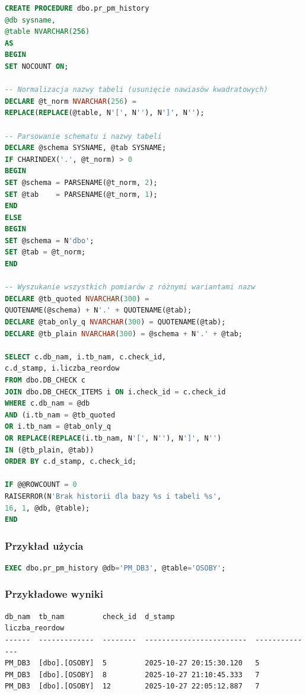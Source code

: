 \documentclass[a4paper,11pt]{article}
\begin{document}
	\begin{lstlisting}[language=SQL]
CREATE PROCEDURE dbo.pr_pm_history
@db sysname,
@table NVARCHAR(256)
AS
BEGIN
SET NOCOUNT ON;
		
-- Normalizacja nazwy tabeli (usunięcie nawiasów kwadratowych)
DECLARE @t_norm NVARCHAR(256) = 
REPLACE(REPLACE(@table, N'[', N''), N']', N'');
		
-- Parsowanie schematu i nazwy tabeli
DECLARE @schema SYSNAME, @tab SYSNAME;
IF CHARINDEX('.', @t_norm) > 0
BEGIN
SET @schema = PARSENAME(@t_norm, 2);
SET @tab    = PARSENAME(@t_norm, 1);
END
ELSE
BEGIN
SET @schema = N'dbo';
SET @tab = @t_norm;
END
		
-- Wyszukanie wszystkich pomiarów z różnymi wariantami nazw
DECLARE @tb_quoted NVARCHAR(300) = 
QUOTENAME(@schema) + N'.' + QUOTENAME(@tab);
DECLARE @tab_only_q NVARCHAR(300) = QUOTENAME(@tab);
DECLARE @tb_plain NVARCHAR(300) = @schema + N'.' + @tab;
		
SELECT c.db_nam, i.tb_nam, c.check_id, 
c.d_stamp, i.liczba_reordow
FROM dbo.DB_CHECK c
JOIN dbo.DB_CHECK_ITEMS i ON i.check_id = c.check_id
WHERE c.db_nam = @db
AND (i.tb_nam = @tb_quoted
OR i.tb_nam = @tab_only_q
OR REPLACE(REPLACE(i.tb_nam, N'[', N''), N']', N'') 
IN (@tb_plain, @tab))
ORDER BY c.d_stamp, c.check_id;
		
IF @@ROWCOUNT = 0
RAISERROR(N'Brak historii dla bazy %s i tabeli %s', 
16, 1, @db, @table);
END
	\end{lstlisting}

	
	\subsubsection{Przykład użycia}
	
	\begin{lstlisting}[language=SQL]
EXEC dbo.pr_pm_history @db='PM_DB3', @table='OSOBY';
	\end{lstlisting}
	
	\subsubsection{Przykładowe wyniki}
	
	\begin{lstlisting}
db_nam  tb_nam         check_id  d_stamp                   liczba_reordow
------  -------------  --------  ------------------------  --------------
PM_DB3  [dbo].[OSOBY]  5         2025-10-27 20:15:30.120   5
PM_DB3  [dbo].[OSOBY]  8         2025-10-27 21:10:45.333   7
PM_DB3  [dbo].[OSOBY]  12        2025-10-27 22:05:12.887   7
	\end{lstlisting}
	
\end{document}
